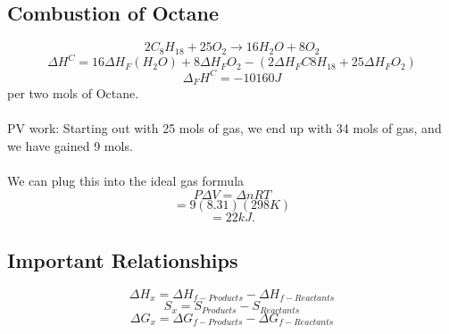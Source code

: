\documentclass[10pt, twocolumn]{report}
\begin{document}
     \subsection{Combustion of Octane}
     $$2C_8H_{18} + 25O_2 \rightarrow 16H_2O + 8 O_2$$
     $$\Delta H^C = 16 \Delta H_F (H_2O) + 8 \Delta H_F O_2 - (2\Delta H_F C8H_{18} + 25\Delta H_F O_2)$$
     $$\Delta_F H^C = -10160 J $$ per two mols of Octane.\\\\ PV work: Starting out with 25 mols of gas, we end up with 34 mols of gas, and we have gained 9 mols. \\\\ We can plug this into the ideal gas formula $$P\Delta V = \Delta n R T$$ $$ = 9 (8.31)(298K)$$ $$=22 kJ. $$
     \subsection{Important Relationships}
	$$\Delta H_x = \Delta H_{f-Products} - \Delta H_{f-Reactants}$$
	$$ S_x = S_{Products} - S_{Reactants}$$
	$$\Delta G_x = \Delta G_{f - Products} - \Delta G_{f - Reactants}$$


\end{document}
